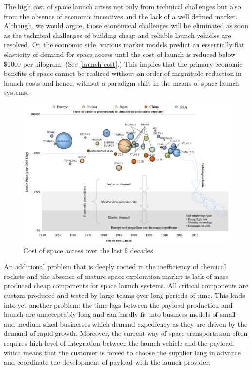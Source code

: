 \documentclass[letter,11pt]{article}
\begin{document}
The high cost of space launch arises not only from technical challenges but
also from the absence of economic incentives and the lack of a well defined
market.  Although, we would argue, those economical challenges will be
eliminated as soon as the technical challenges of building cheap and reliable
launch vehicles are resolved. On the economic side, various market models
predict an essentially flat elasticity of demand for space access until the
cost of launch is reduced below \$1000 per kilogram\cite{CommSpace1997}. (See
\autoref{launch-cost}.) This implies that the primary economic benefits of space
cannot be realized without an order of magnitude reduction in launch costs and
hence, without a paradigm shift in the means of space launch systems. 
 
\begin{figure}[bt!]
	\centering
	\includegraphics[width=\textwidth]{launch-cost}
	\caption{Cost of space access over the last 5 decades}
	\label{launch-cost}
\end{figure}

An additional problem that is deeply rooted in the inefficiency of chemical
rockets and the absence of mature space exploration market is lack of mass
produced cheap components for space launch systems. All critical components are
custom produced and tested by large teams over long periods of time. This leads
into yet another problem: the time lags between the payload production and
launch are unacceptably long and can hardly fit into business models of small-
and medium-sized businesses which demand expediency as they are driven by the
demand of rapid growth. Moreover, the current way of space transportation often
requires high level of integration between the launch vehicle and the payload,
which means that the customer is forced to choose the supplier long in advance
and coordinate the development of payload with the launch provider. 
\end{document}

